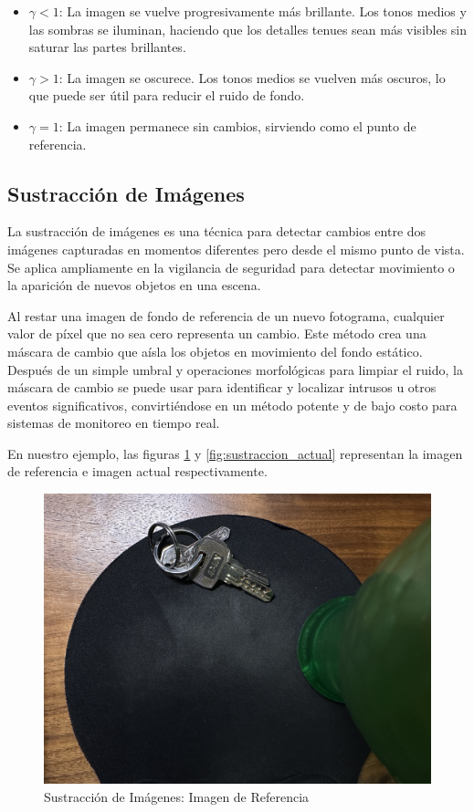 \documentclass[12pt,letterpaper]{article}
\begin{document}
\begin{itemize}
  \item \textbf{$\gamma < 1$}: La imagen se vuelve progresivamente más brillante. Los tonos medios y las sombras se iluminan, haciendo que los detalles tenues sean más visibles sin saturar las partes brillantes.
  \item \textbf{$\gamma > 1$}: La imagen se oscurece. Los tonos medios se vuelven más oscuros, lo que puede ser útil para reducir el ruido de fondo.
  \item \textbf{$\gamma = 1$}: La imagen permanece sin cambios, sirviendo como el punto de referencia.
\end{itemize}

\subsection{Sustracción de Imágenes}

La sustracción de imágenes es una técnica para detectar cambios entre dos imágenes capturadas en momentos diferentes pero desde el mismo punto de vista. Se aplica ampliamente en la vigilancia de seguridad para detectar movimiento o la aparición de nuevos objetos en una escena.

Al restar una imagen de fondo de referencia de un nuevo fotograma, cualquier valor de píxel que no sea cero representa un cambio. Este método crea una máscara  de cambio que aísla los objetos en movimiento del fondo estático. Después de un simple umbral y operaciones morfológicas para limpiar el ruido, la máscara de cambio se puede usar para identificar y localizar intrusos u otros eventos significativos, convirtiéndose en un método potente y de bajo costo para sistemas de monitoreo en tiempo real.

En nuestro ejemplo, las figuras \ref{fig:sustraccion_referencia} y \ref{fig:sustraccion_actual} representan la imagen de referencia e imagen actual respectivamente.

\begin{figure}[H]
  \centering
  \includegraphics[width=0.5\linewidth]{../data/data-substraction-sample/img-1.jpg}
  \caption{Sustracción de Imágenes: Imagen de Referencia}
  \label{fig:sustraccion_referencia}
\end{figure}
\end{document}
